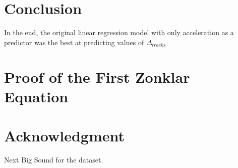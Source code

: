 \documentclass[conference]{IEEEtran}
\begin{document}
{\section{Conclusion}
In the end, the original linear regression model with only acceleration as a predictor was the best at predicting values of $\Delta_{tracks}$






%


\appendices
\section{Proof of the First Zonklar Equation}
\blindtext

\section*{Acknowledgment}

Next Big Sound for the dataset.


\ifCLASSOPTIONcaptionsoff
  \newpage
\fi



}
\end{document}
